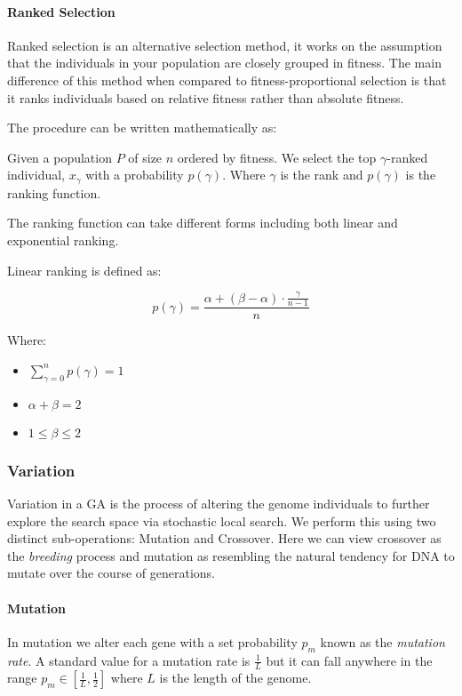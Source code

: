 \paragraph{Ranked Selection}\label{imp:RankSel}

Ranked selection is an alternative selection method, it works on the assumption that the individuals in your population are closely grouped in fitness. The main difference of this method when compared to fitness-proportional selection is that it ranks individuals based on relative fitness rather than absolute fitness.

The procedure can be written mathematically as:

Given a population $P$ of size $n$ ordered by fitness. We select the top \(\gamma\)-ranked individual, $x_{\gamma}$ with a probability $p(\gamma)$. Where \(\gamma\) is the rank and $p(\gamma)$ is the ranking function.

The ranking function can take different forms including both linear and exponential ranking.

Linear ranking is defined as:

\begin{equation}
p(\gamma)= \frac{\alpha + (\beta-\alpha) \cdot \frac{\gamma}{n-1}}{n}
\end{equation}

Where:

\begin{itemize}
  \item $\sum_{\gamma=0}^n p(\gamma) = 1$
  \item $\alpha + \beta = 2$
  \item $1 \leq \beta \leq 2$
\end{itemize}

\subsubsection{Variation}

Variation in a GA is the process of altering the genome individuals to further explore the search space via stochastic local search.
We perform this using two distinct sub-operations: Mutation and Crossover.
Here we can view crossover as the \textit{breeding} process and mutation as resembling the natural tendency for DNA to mutate over the course of generations.

\paragraph{Mutation}
In mutation we alter each gene with a set probability $p_m$ known as the \textit{mutation rate}. A standard value for a mutation rate is $ \frac{1}{L} $ but it can fall anywhere in the range $p_m \in [ \frac{1}{L} , \frac{1}{2} ] $ where $L$ is the length of the genome.

